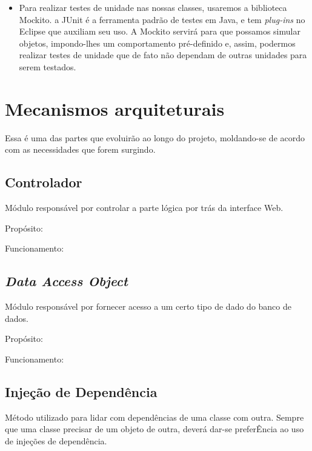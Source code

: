 \documentclass[11pt, a4paper]{article}
\begin{document}
\begin{itemize}
            \item Para realizar testes de unidade nas nossas classes, usaremos a
            biblioteca Mockito. a JUnit é a ferramenta padrão de testes em Java,
            e tem \textit{plug-ins} no Eclipse que auxiliam seu uso. A Mockito
            servirá para que possamos simular objetos, impondo-lhes um
            comportamento pré-definido e, assim, podermos realizar testes de
            unidade que de fato não dependam de outras unidades para serem
            testados.
        \end{itemize}
    
    \section{Mecanismos arquiteturais}
        Essa é uma das partes que evoluirão ao longo do projeto, moldando-se de
        acordo com as necessidades que forem surgindo.

        \subsection{Controlador}
            Módulo responsável por controlar a parte lógica por trás da
            interface Web.

            Propósito: %

            Funcionamento: %

        \subsection{\textit{Data Access Object}}
            Módulo responsável por fornecer acesso a um certo tipo de dado do
            banco de dados.

            Propósito: %

            Funcionamento: %

        \subsection{Injeção de Dependência}
            Método utilizado para lidar com dependências de uma classe com
            outra. Sempre que uma classe precisar de um objeto de outra,
            deverá dar-se preferÊncia ao uso de injeções de dependência.
\end{document}
